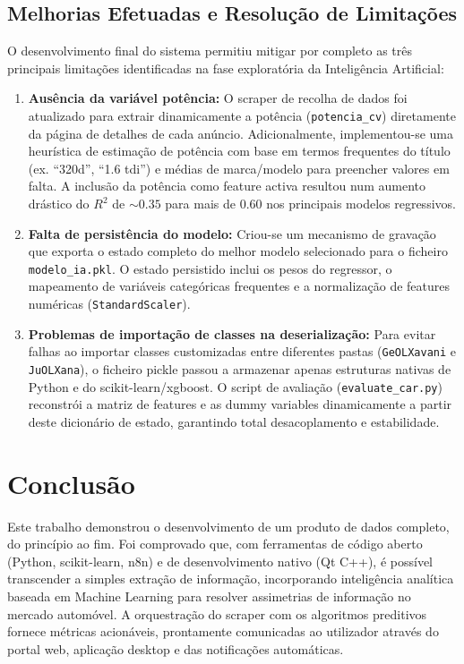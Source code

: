 \documentclass[11pt,a4paper]{article}
\begin{document}
\subsection{Melhorias Efetuadas e Resolução de Limitações}
O desenvolvimento final do sistema permitiu mitigar por completo as três principais limitações identificadas na fase exploratória da Inteligência Artificial:
\begin{enumerate}
    \item \textbf{Ausência da variável potência:} O scraper de recolha de dados foi atualizado para extrair dinamicamente a potência (\texttt{potencia\_cv}) diretamente da página de detalhes de cada anúncio. Adicionalmente, implementou-se uma heurística de estimação de potência com base em termos frequentes do título (ex. ``320d'', ``1.6 tdi'') e médias de marca/modelo para preencher valores em falta. A inclusão da potência como feature activa resultou num aumento drástico do $R^2$ de $\sim 0.35$ para mais de $0.60$ nos principais modelos regressivos.
    \item \textbf{Falta de persistência do modelo:} Criou-se um mecanismo de gravação que exporta o estado completo do melhor modelo selecionado para o ficheiro \texttt{modelo\_ia.pkl}. O estado persistido inclui os pesos do regressor, o mapeamento de variáveis categóricas frequentes e a normalização de features numéricas (\texttt{StandardScaler}).
    \item \textbf{Problemas de importação de classes na deserialização:} Para evitar falhas ao importar classes customizadas entre diferentes pastas (\texttt{GeOLXavani} e \texttt{JuOLXana}), o ficheiro pickle passou a armazenar apenas estruturas nativas de Python e do scikit-learn/xgboost. O script de avaliação (\texttt{evaluate\_car.py}) reconstrói a matriz de features e as dummy variables dinamicamente a partir deste dicionário de estado, garantindo total desacoplamento e estabilidade.
\end{enumerate}

\section{Conclusão}
Este trabalho demonstrou o desenvolvimento de um produto de dados completo, do princípio ao fim. Foi comprovado que, com ferramentas de código aberto (Python, scikit-learn, n8n) e de desenvolvimento nativo (Qt C++), é possível transcender a simples extração de informação, incorporando inteligência analítica baseada em Machine Learning para resolver assimetrias de informação no mercado automóvel. A orquestração do scraper com os algoritmos preditivos fornece métricas acionáveis, prontamente comunicadas ao utilizador através do portal web, aplicação desktop e das notificações automáticas.
\end{document}
